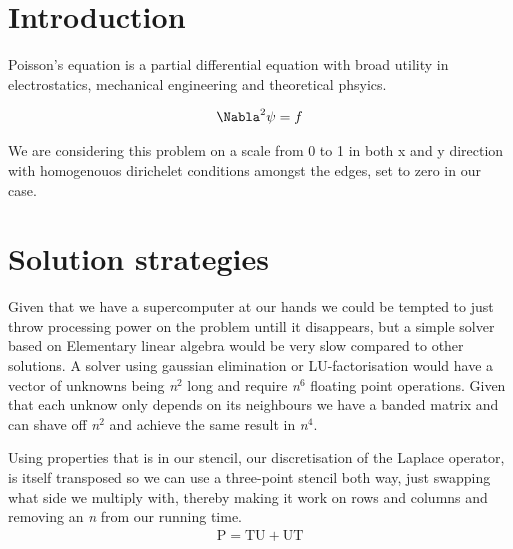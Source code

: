 \section{Introduction}
Poisson's equation is a partial differential equation with broad utility in
electrostatics, mechanical engineering and theoretical phsyics.\cite{wiki}

\begin{align}
	\Nabla^2 \psi &= f \\
\end{align}

We are considering this problem on a scale from 0 to 1 in both x and y
direction with homogenouos dirichelet conditions amongst the edges, set to zero
in our case. 

\section{Solution strategies}
Given that we have a supercomputer at our hands we could be tempted to just
throw processing power on the problem untill it disappears, but a simple solver
based on Elementary linear algebra would be very slow compared to other
solutions. A solver using gaussian elimination or LU-factorisation would have a
vector of unknowns being \emph{n}$^2$ long and require \emph{n}$^6$ floating
point operations. Given that each unknow only depends on its neighbours we have
a banded matrix and can shave off \emph{n}$^2$ and achieve the same result in
\emph{n}$^4$. 

Using properties that is in our stencil, our discretisation of the Laplace
operator, is itself transposed so we can use a three-point stencil both way,
just swapping what side we multiply with, thereby making it work on rows and
columns and removing an \emph{n} from our running time. 
\begin{align}
\mathrm{P}=\mathrm{TU+UT}
\end{align}

